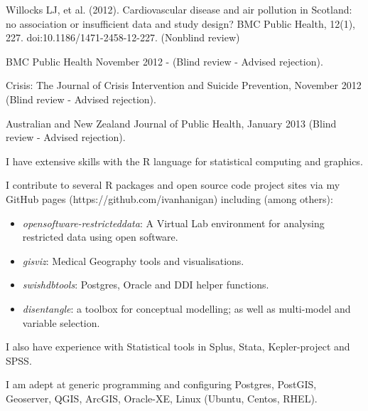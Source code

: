 \documentclass[a4paper,11pt]{article}
\begin{document}
\begin{revnumerate}

\item Willocks LJ, et al. (2012). Cardiovascular disease and air pollution in Scotland: no association or insufficient data and study design? BMC Public Health, 12(1), 227. doi:10.1186/1471-2458-12-227. (Nonblind review)

\item BMC Public Health November 2012 - (Blind review - Advised rejection).

\item Crisis: The Journal of Crisis Intervention and Suicide Prevention, November 2012 (Blind review - Advised rejection).

\item Australian and New Zealand Journal of Public Health, January 2013 (Blind review - Advised rejection).

\end{revnumerate}

\newpage

\medskip
\renewcommand{\labelenumi}{\textsc{j}\theenumi.}
\begin{revnumerate}

\item I have extensive skills with the R language for statistical computing and graphics.

\item I contribute to several R packages and open source code project sites via my GitHub pages (https://github.com/ivanhanigan) including (among others): 

\begin{itemize}
\item \emph{opensoftware-restricteddata}: A Virtual Lab environment for analysing restricted data using open software.
\item \emph{gisviz}: Medical Geography tools and visualisations.
\item \emph{swishdbtools}: Postgres, Oracle and DDI helper functions.
\item \emph{disentangle}: a toolbox for conceptual modelling; as well as multi-model and variable selection.
\end{itemize}

\item I also have experience with Statistical tools in Splus, Stata, Kepler-project and SPSS.

\item I am adept at generic programming and configuring Postgres, PostGIS, Geoserver, QGIS, ArcGIS,  Oracle-XE, Linux (Ubuntu, Centos, RHEL).
\end{revnumerate}
\end{document}
